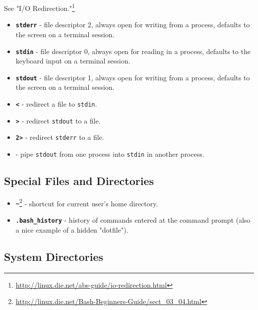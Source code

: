 \documentclass[10pt,american,]{book}
\renewcommand{\href}[2]{#2\footnote{\url{#1}}}
\numberwithin{figure}{chapter}
\begin{document}
See \href{http://linux.die.net/abs-guide/io-redirection.html}{"I/O
Redirection."}

\begin{itemize}
\item
  \textbf{\texttt{stderr}} - file descriptor 2, always
  open for writing from a process, defaults to the screen on a terminal
  session.
\item
  \textbf{\texttt{stdin}} - file descriptor 0, always open
  for reading in a process, defaults to the keyboard input on a terminal
  session.
\item
  \textbf{\texttt{stdout}} - file descriptor 1, always
  open for writing from a process, defaults to the screen on a terminal
  session.
\item
  \textbf{\texttt{\textless{}}} - redirect a file to \texttt{stdin}.
\item
  \textbf{\texttt{\textgreater{}}} - redirect \texttt{stdout} to a file.
\item
  \textbf{\texttt{2\textgreater{}}} - redirect \texttt{stderr} to a
  file.
\item
  \textbf{\texttt{\textbar{}}} - pipe \texttt{stdout} from one process
  into \texttt{stdin} in another process.
\end{itemize}

\subsection*{Special Files and
Directories}\label{special-files-and-directories}

\begin{itemize}
\item
  \href{http://linux.die.net/Bash-Beginners-Guide/sect_03_04.html}{\textbf{\texttt{\textasciitilde{}}}}
  - shortcut for current user's home directory.
\item
  \textbf{\texttt{.bash\_history}} - history of
  commands entered at the command prompt (also a nice example of a
  hidden "dotfile").
\end{itemize}

\subsection*{System Directories}\label{system-directories}
\end{document}
